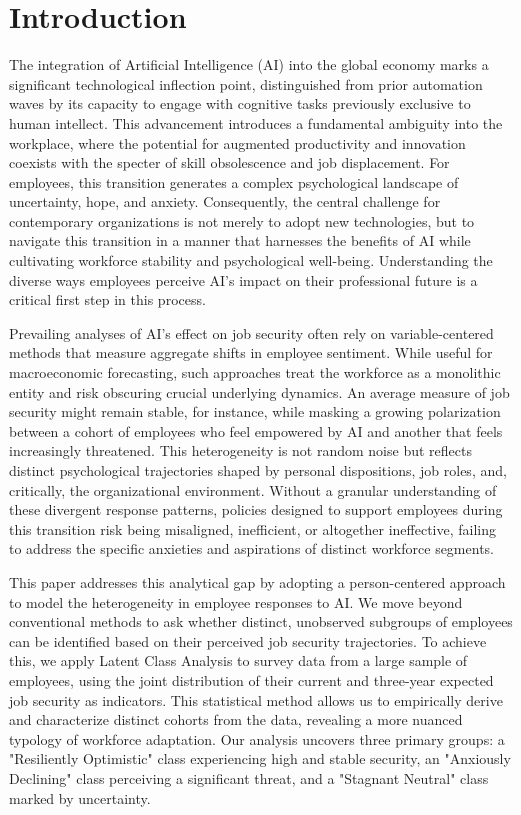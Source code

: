 \documentclass[]{article}
\begin{document}
\section{Introduction}
\label{sec:intro}
The integration of Artificial Intelligence (AI) into the global economy marks a significant technological inflection point, distinguished from prior automation waves by its capacity to engage with cognitive tasks previously exclusive to human intellect. This advancement introduces a fundamental ambiguity into the workplace, where the potential for augmented productivity and innovation coexists with the specter of skill obsolescence and job displacement. For employees, this transition generates a complex psychological landscape of uncertainty, hope, and anxiety. Consequently, the central challenge for contemporary organizations is not merely to adopt new technologies, but to navigate this transition in a manner that harnesses the benefits of AI while cultivating workforce stability and psychological well-being. Understanding the diverse ways employees perceive AI's impact on their professional future is a critical first step in this process.

Prevailing analyses of AI's effect on job security often rely on variable-centered methods that measure aggregate shifts in employee sentiment. While useful for macroeconomic forecasting, such approaches treat the workforce as a monolithic entity and risk obscuring crucial underlying dynamics. An average measure of job security might remain stable, for instance, while masking a growing polarization between a cohort of employees who feel empowered by AI and another that feels increasingly threatened. This heterogeneity is not random noise but reflects distinct psychological trajectories shaped by personal dispositions, job roles, and, critically, the organizational environment. Without a granular understanding of these divergent response patterns, policies designed to support employees during this transition risk being misaligned, inefficient, or altogether ineffective, failing to address the specific anxieties and aspirations of distinct workforce segments.

This paper addresses this analytical gap by adopting a person-centered approach to model the heterogeneity in employee responses to AI. We move beyond conventional methods to ask whether distinct, unobserved subgroups of employees can be identified based on their perceived job security trajectories. To achieve this, we apply Latent Class Analysis to survey data from a large sample of employees, using the joint distribution of their current and three-year expected job security as indicators. This statistical method allows us to empirically derive and characterize distinct cohorts from the data, revealing a more nuanced typology of workforce adaptation. Our analysis uncovers three primary groups: a "Resiliently Optimistic" class experiencing high and stable security, an "Anxiously Declining" class perceiving a significant threat, and a "Stagnant Neutral" class marked by uncertainty.
\end{document}
